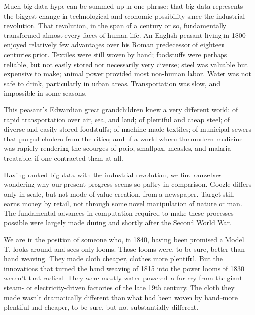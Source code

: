 \documentclass[12pt]{article}
\begin{document}
Much big data hype can be summed up in one phrase: that big data
represents the biggest change in technological and economic possibility since the
industrial revolution. That revolution, in the span of a century or
so, fundamentally transformed almost every facet of human life. An
English peasant living in 1800 enjoyed relatively few advantages over
his Roman predecessor of eighteen centuries prior. Textiles were still
woven by hand; foodstuffs were perhaps reliable, but not easily stored
nor necessarily very diverse; steel was valuable but expensive to
make; animal power provided most non-human labor. Water was not safe
to drink, particularly in urban areas. Transportation was slow, and
impossible in some seasons. 

This peasant's Edwardian great grandchildren knew a very different
world: of rapid transportation over air, sea, and land; of plentiful
and cheap steel; of diverse and easily stored foodstuffs; of
machine-made textiles; of municipal sewers that purged cholera from
the cities; and of a world where the modern medicine
was rapidly rendering the scourges of polio, smallpox, measles,
and malaria treatable, if one contracted them at all. 

Having ranked big data with the industrial revolution, we find
ourselves wondering why our present progress seems so paltry in
comparison. Google differs only in scale, but not mode of value
creation, from a newspaper. Target still earns money by retail, not
through some novel manipulation of nature or man. The fundamental
advances in computation required to make these processes possible were
largely made during and shortly after the Second World War. 


We are in the position of someone who, in 1840, having been promised a
Model T, looks around and sees only looms. Those looms were, to be
sure, better than hand weaving. They made cloth cheaper, clothes more
plentiful. But the innovations that turned the hand weaving of
1815 into the power looms of 1830 weren't that radical. They were
mostly water-powered--a far cry from the giant steam- or
electricity-driven factories of the late 19th century. The cloth they
made wasn't dramatically different than what had been woven by
hand--more plentiful and cheaper, to be sure, but not substantially
different.  
\end{document}
